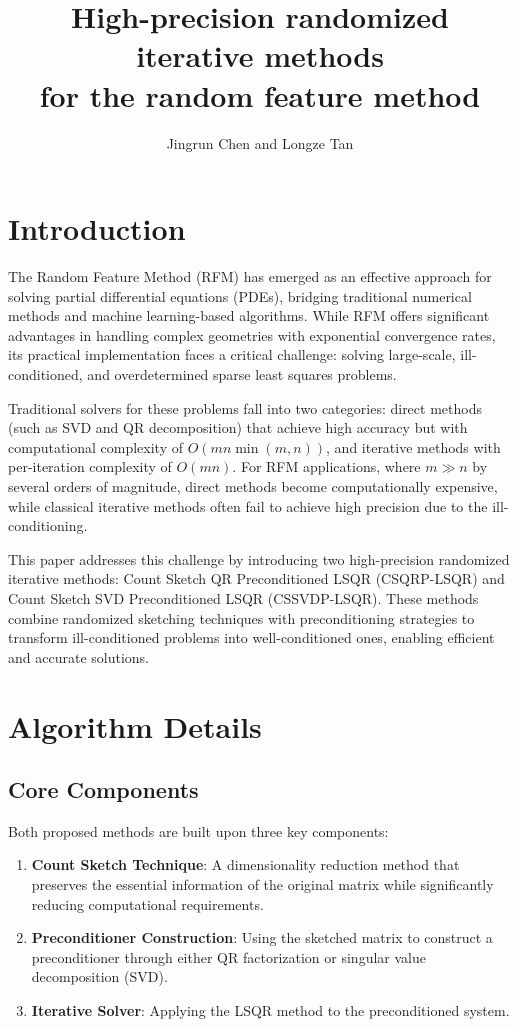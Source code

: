 \documentclass[11pt]{article}
\title{High-precision randomized iterative methods \\ for the random feature method}
\author{Jingrun Chen and Longze Tan}
\date{}
\begin{document}
\maketitle

\section{Introduction}

The Random Feature Method (RFM) has emerged as an effective approach for solving partial differential equations (PDEs), bridging traditional numerical methods and machine learning-based algorithms. While RFM offers significant advantages in handling complex geometries with exponential convergence rates, its practical implementation faces a critical challenge: solving large-scale, ill-conditioned, and overdetermined sparse least squares problems.

Traditional solvers for these problems fall into two categories: direct methods (such as SVD and QR decomposition) that achieve high accuracy but with computational complexity of $O(mn\min(m,n))$, and iterative methods with per-iteration complexity of $O(mn)$. For RFM applications, where $m \gg n$ by several orders of magnitude, direct methods become computationally expensive, while classical iterative methods often fail to achieve high precision due to the ill-conditioning.

This paper addresses this challenge by introducing two high-precision randomized iterative methods: Count Sketch QR Preconditioned LSQR (CSQRP-LSQR) and Count Sketch SVD Preconditioned LSQR (CSSVDP-LSQR). These methods combine randomized sketching techniques with preconditioning strategies to transform ill-conditioned problems into well-conditioned ones, enabling efficient and accurate solutions.

\section{Algorithm Details}

\subsection{Core Components}

Both proposed methods are built upon three key components:

\begin{enumerate}
    \item \textbf{Count Sketch Technique}: A dimensionality reduction method that preserves the essential information of the original matrix while significantly reducing computational requirements.
    \item \textbf{Preconditioner Construction}: Using the sketched matrix to construct a preconditioner through either QR factorization or singular value decomposition (SVD).
    \item \textbf{Iterative Solver}: Applying the LSQR method to the preconditioned system.
\end{enumerate}
\end{document}
